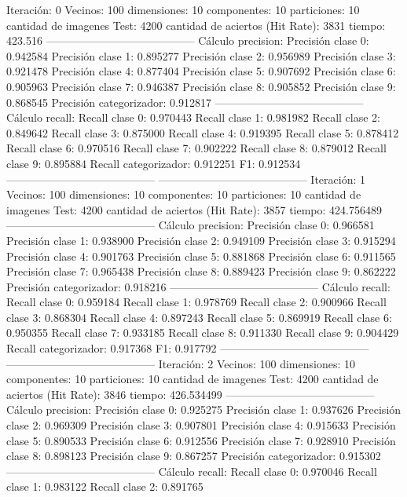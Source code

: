 Iteración: 0
Vecinos: 100
dimensiones: 10
componentes: 10
particiones: 10
cantidad de imagenes Test: 4200
cantidad de aciertos (Hit Rate): 3831
tiempo: 423.516
-----------------------------------------
Cálculo precision: 
Precisión clase 0: 0.942584
Precisión clase 1: 0.895277
Precisión clase 2: 0.956989
Precisión clase 3: 0.921478
Precisión clase 4: 0.877404
Precisión clase 5: 0.907692
Precisión clase 6: 0.905963
Precisión clase 7: 0.946387
Precisión clase 8: 0.905852
Precisión clase 9: 0.868545
Precisión categorizador: 0.912817
-----------------------------------------
Cálculo recall: 
Recall clase 0: 0.970443
Recall clase 1: 0.981982
Recall clase 2: 0.849642
Recall clase 3: 0.875000
Recall clase 4: 0.919395
Recall clase 5: 0.878412
Recall clase 6: 0.970516
Recall clase 7: 0.902222
Recall clase 8: 0.879012
Recall clase 9: 0.895884
Recall categorizador: 0.912251
F1: 0.912534
-----------------------------------------
-----------------------------------------
Iteración: 1
Vecinos: 100
dimensiones: 10
componentes: 10
particiones: 10
cantidad de imagenes Test: 4200
cantidad de aciertos (Hit Rate): 3857
tiempo: 424.756489
-----------------------------------------
Cálculo precision: 
Precisión clase 0: 0.966581
Precisión clase 1: 0.938900
Precisión clase 2: 0.949109
Precisión clase 3: 0.915294
Precisión clase 4: 0.901763
Precisión clase 5: 0.881868
Precisión clase 6: 0.911565
Precisión clase 7: 0.965438
Precisión clase 8: 0.889423
Precisión clase 9: 0.862222
Precisión categorizador: 0.918216
-----------------------------------------
Cálculo recall: 
Recall clase 0: 0.959184
Recall clase 1: 0.978769
Recall clase 2: 0.900966
Recall clase 3: 0.868304
Recall clase 4: 0.897243
Recall clase 5: 0.869919
Recall clase 6: 0.950355
Recall clase 7: 0.933185
Recall clase 8: 0.911330
Recall clase 9: 0.904429
Recall categorizador: 0.917368
F1: 0.917792
-----------------------------------------
-----------------------------------------
Iteración: 2
Vecinos: 100
dimensiones: 10
componentes: 10
particiones: 10
cantidad de imagenes Test: 4200
cantidad de aciertos (Hit Rate): 3846
tiempo: 426.534499
-----------------------------------------
Cálculo precision: 
Precisión clase 0: 0.925275
Precisión clase 1: 0.937626
Precisión clase 2: 0.969309
Precisión clase 3: 0.907801
Precisión clase 4: 0.915633
Precisión clase 5: 0.890533
Precisión clase 6: 0.912556
Precisión clase 7: 0.928910
Precisión clase 8: 0.898123
Precisión clase 9: 0.867257
Precisión categorizador: 0.915302
-----------------------------------------
Cálculo recall: 
Recall clase 0: 0.970046
Recall clase 1: 0.983122
Recall clase 2: 0.891765

